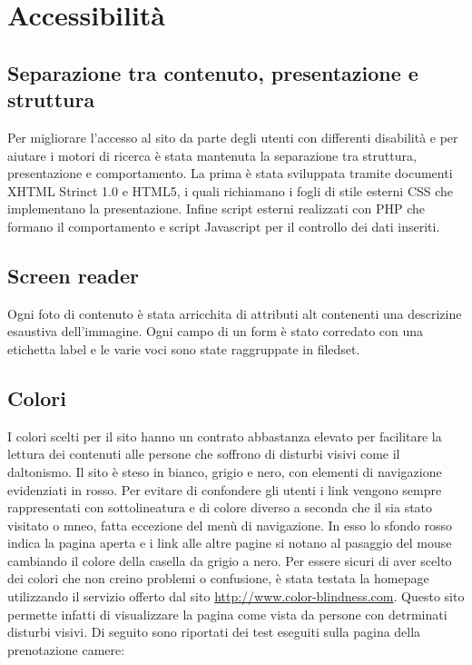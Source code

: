 \section{Accessibilità}
\subsection{Separazione tra contenuto, presentazione e struttura}
Per migliorare l'accesso al sito da parte degli utenti con differenti disabilità e per aiutare i motori di ricerca è stata mantenuta la separazione tra struttura, presentazione e comportamento.
La prima è stata sviluppata tramite documenti XHTML Strinct 1.0 e HTML5, i quali richiamano i fogli di stile esterni CSS che implementano la presentazione.
Infine script esterni realizzati con PHP che formano il comportamento e script Javascript per il controllo dei dati inseriti.
\subsection{Screen reader}
Ogni foto di contenuto è stata arricchita di attributi alt contenenti una descrizine esaustiva dell'immagine.
Ogni campo di un form è stato corredato con una etichetta label e le varie voci sono state raggruppate in filedset.
\subsection{Colori}
I colori scelti per il sito hanno un contrato abbastanza elevato per facilitare la lettura dei contenuti alle persone che soffrono di disturbi visivi come il daltonismo.
Il sito è steso in bianco, grigio e nero, con elementi di navigazione evidenziati in rosso.
Per evitare di confondere gli utenti i link vengono sempre rappresentati con sottolineatura e di colore diverso a seconda che il sia stato visitato o mneo, fatta eccezione del menù di navigazione.
In esso lo sfondo rosso indica la pagina aperta e i link alle altre pagine si notano al pasaggio del mouse cambiando il colore della casella da grigio a nero.
Per essere sicuri di aver scelto dei colori che non creino problemi o confusione, è stata testata la homepage utilizzando il servizio offerto dal sito \underline{\color{Blue}http://www.color-blindness.com}.
Questo sito permette infatti di visualizzare la pagina come vista da persone con detrminati disturbi visivi.
Di seguito sono riportati dei test eseguiti sulla pagina della prenotazione camere:

